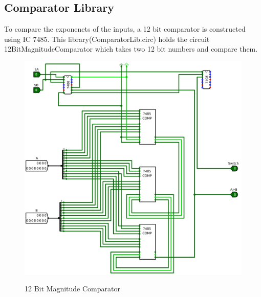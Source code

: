 \documentclass[12pt]{article}
\begin{document}
\subsection{Comparator Library}
To compare the exponenets of the inputs, a 12 bit comparator is constructed using IC 7485. This library(ComparatorLib.circ) holds the circuit 12BitMagnitudeComparator which takes two 12 bit numbers and compare them.
\begin{figure}[H]
    \centering
        \includegraphics[width=\textwidth]{Images/12BitMagnitudeComparator.png}
        \label{fig:12bitmagcomp}
    \caption{12 Bit Magnitude Comparator}
\end{figure}
\end{document}
